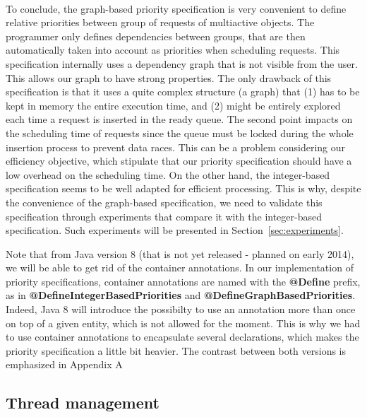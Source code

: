 \documentclass[11pt]{report}
\begin{document}
\paragraph{}
To conclude, the graph-based priority specification is very convenient to define relative priorities between group of requests of multiactive objects. The programmer only defines dependencies between groups, that are then automatically taken into account as priorities when scheduling requests. This specification internally uses a dependency graph that is not visible from the user. This allows our graph to have strong properties. The only drawback of this specification is that it uses a quite complex structure (a graph) that (1) has to be kept in memory the entire execution time, and (2) might be entirely explored each time a request is inserted in the ready queue. The second point impacts on the scheduling time of requests since the queue must be locked during the whole insertion process to prevent data races. This can be a problem considering our efficiency objective, which stipulate that our priority specification should have a low overhead on the scheduling time. On the other hand, the integer-based specification seems to be well adapted for efficient processing. This is why, despite the convenience of the graph-based specification, we need to validate this specification through experiments that compare it with the integer-based specification. Such experiments will be presented in Section~\ref{sec:experiments}.

Note that from Java version 8 (that is not yet released - planned on early 2014), we will be able to get rid of the container annotations. In our implementation of priority specifications, container annotations are named with the \textbf{@Define} prefix, as in \textbf{@DefineIntegerBasedPriorities} and \textbf{@DefineGraphBasedPriorities}. Indeed, Java 8 will introduce the possibilty to use an annotation more than once on top of a given entity, which is not allowed for the moment. This is why we had to use container annotations to encapsulate several declarations, which makes the priority specification a little bit heavier. The contrast between both versions is emphasized in Appendix A

\subsection{Thread management}
\end{document}
